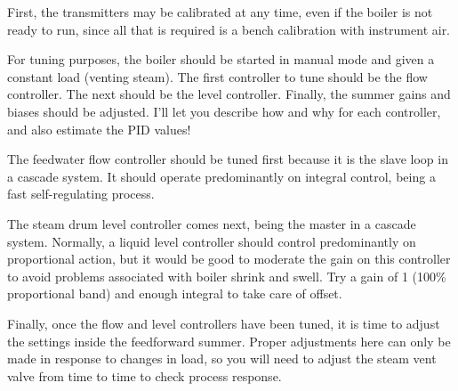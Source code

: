 





First, the transmitters may be calibrated at any time, even if the boiler is not ready to run, since all that is required is a bench calibration with instrument air.

\vskip 10pt

For tuning purposes, the boiler should be started in manual mode and given a constant load (venting steam).  The first controller to tune should be the flow controller.  The next should be the level controller.  Finally, the summer gains and biases should be adjusted.  I'll let you describe how and why for each controller, and also estimate the PID values!







The feedwater flow controller should be tuned first because it is the slave loop in a cascade system.  It should operate predominantly on integral control, being a fast self-regulating process.

The steam drum level controller comes next, being the master in a cascade system.  Normally, a liquid level controller should control predominantly on proportional action, but it would be good to moderate the gain on this controller to avoid problems associated with boiler shrink and swell.  Try a gain of 1 (100\% proportional band) and enough integral to take care of offset.

Finally, once the flow and level controllers have been tuned, it is time to adjust the settings inside the feedforward summer.  Proper adjustments here can only be made in response to changes in load, so you will need to adjust the steam vent valve from time to time to check process response.





